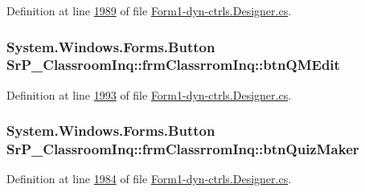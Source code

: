 \-Definition at line \hyperlink{_form1-dyn-ctrls_8_designer_8cs_source_l01989}{1989} of file \hyperlink{_form1-dyn-ctrls_8_designer_8cs_source}{\-Form1-\/dyn-\/ctrls.\-Designer.\-cs}.

\hypertarget{class_sr_p___classroom_inq_1_1frm_classrrom_inq_ab86f3e7a592038c27499e00ec0a7fb3b}{
\subsubsection[{btn\-Q\-M\-Edit}]{\setlength{\rightskip}{0pt plus 5cm}\-System.\-Windows.\-Forms.\-Button {\bf \-Sr\-P\-\_\-\-Classroom\-Inq\-::frm\-Classrrom\-Inq\-::btn\-Q\-M\-Edit}}}
\label{class_sr_p___classroom_inq_1_1frm_classrrom_inq_ab86f3e7a592038c27499e00ec0a7fb3b}


\-Definition at line \hyperlink{_form1-dyn-ctrls_8_designer_8cs_source_l01993}{1993} of file \hyperlink{_form1-dyn-ctrls_8_designer_8cs_source}{\-Form1-\/dyn-\/ctrls.\-Designer.\-cs}.

\hypertarget{class_sr_p___classroom_inq_1_1frm_classrrom_inq_a521d725b634462f428d792ca3db59e2e}{
\subsubsection[{btn\-Quiz\-Maker}]{\setlength{\rightskip}{0pt plus 5cm}\-System.\-Windows.\-Forms.\-Button {\bf \-Sr\-P\-\_\-\-Classroom\-Inq\-::frm\-Classrrom\-Inq\-::btn\-Quiz\-Maker}}}
\label{class_sr_p___classroom_inq_1_1frm_classrrom_inq_a521d725b634462f428d792ca3db59e2e}


\-Definition at line \hyperlink{_form1-dyn-ctrls_8_designer_8cs_source_l01984}{1984} of file \hyperlink{_form1-dyn-ctrls_8_designer_8cs_source}{\-Form1-\/dyn-\/ctrls.\-Designer.\-cs}.

